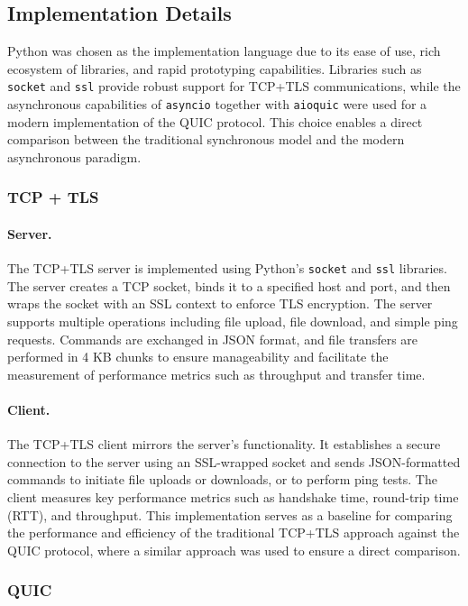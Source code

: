 \subsection{Implementation Details}
Python was chosen as the implementation language due to its ease of use, rich ecosystem of libraries, and rapid prototyping capabilities. Libraries such as \texttt{socket} and \texttt{ssl} provide robust support for TCP+TLS communications, while the asynchronous capabilities of \texttt{asyncio} together with \texttt{aioquic} were used for a modern implementation of the QUIC protocol. This choice enables a direct comparison between the traditional synchronous model and the modern asynchronous paradigm.

\subsubsection{TCP + TLS}
\paragraph{Server.} The TCP+TLS server is implemented using Python's \texttt{socket} and \texttt{ssl} libraries. The server creates a TCP socket, binds it to a specified host and port, and then wraps the socket with an SSL context to enforce TLS encryption. The server supports multiple operations including file upload, file download, and simple ping requests. Commands are exchanged in JSON format, and file transfers are performed in 4 KB chunks to ensure manageability and facilitate the measurement of performance metrics such as throughput and transfer time.

\paragraph{Client.} The TCP+TLS client mirrors the server's functionality. It establishes a secure connection to the server using an SSL-wrapped socket and sends JSON-formatted commands to initiate file uploads or downloads, or to perform ping tests. The client measures key performance metrics such as handshake time, round-trip time (RTT), and throughput. This implementation serves as a baseline for comparing the performance and efficiency of the traditional TCP+TLS approach against the QUIC protocol, where a similar approach was used to ensure a direct comparison.

\subsubsection{QUIC}
